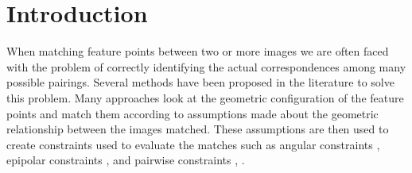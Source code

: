 \documentclass[12pt,journal,compsoc]{IEEEtran}
\begin{document}
\section{Introduction}
%
When matching feature points between two or more images we are often 
faced with the problem of correctly identifying the actual 
correspondences among many possible pairings. Several methods have been 
proposed in the literature to solve this problem. Many approaches look 
at the geometric configuration of the feature points and match them 
according to assumptions made about the geometric relationship between 
the images matched. These assumptions are then used to create 
constraints used to evaluate the matches such as angular constraints 
\cite{kim2008efficient}, epipolar constraints \cite{torr2000mlesac}, 
\cite{chum2005matching} and pairwise constraints \cite{choi2009robust}, 
\cite{leordeanu2005spectral}.
%
\end{document}
